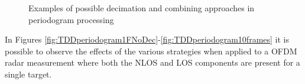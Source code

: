 \begin{figure}[H]
        \hfill
        
        \caption{Examples of possible decimation and combining approaches in periodogram processing}
        \label{fig:allperiodogram-decimation}
    \end{figure}

    In Figures \ref{fig:TDDperiodogram1FNoDec}-\ref{fig:TDDperiodogram10frames} it is possible to observe the effects of the various strategies when applied to a OFDM radar measurement where both the NLOS and LOS components are present for a single target.



